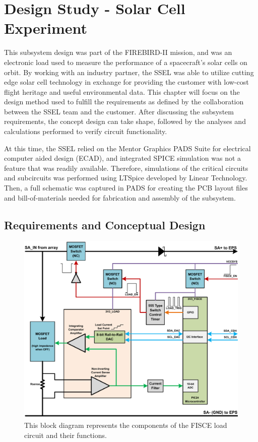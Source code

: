 \chapter{Design Study - Solar Cell Experiment}\label{CH:Design1}
This subsystem design was part of the FIREBIRD-II mission, and was an electronic load used to measure the performance of a spacecraft's solar cells on orbit. By working with an industry partner, the SSEL was able to utilize cutting edge solar cell technology in exchange for providing the customer with low-cost flight heritage and useful environmental data. This chapter will focus on the design method used to fulfill the requirements as defined by the collaboration between the SSEL team and the customer. After discussing the subsystem requirements, the concept design can take shape, followed by the analyses and calculations performed to verify circuit functionality. 

At this time, the SSEL relied on the Mentor Graphics PADS Suite for electrical computer aided design (ECAD), and integrated SPICE simulation was not a feature that was readily available. Therefore, simulations of the critical circuits and subcircuits was performed using LTSpice developed by Linear Technology. Then, a full schematic was captured in PADS for creating the PCB layout files and bill-of-materials needed for fabrication and assembly of the subsystem. 

\section{Requirements and Conceptual Design}\label{Sect:test}



\begin{figure}[htbp]
	\centering
	\includegraphics[width=\textwidth]{../figs/fisce/concept/fisce_panel_diagram_load_control.pdf}
	\caption{This block diagram represents the components of the FISCE load circuit and their functions.}
	\label{fig:plot}
\end{figure}



